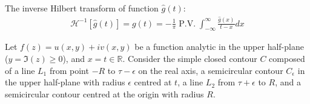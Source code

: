 \documentclass[12pt, english]{book}
\makeatletter
\renewenvironment{proof}[1][\proofname]{\par
	\pushQED{\qed}%
	\normalfont \topsep6\p@\@plus6\p@\relax
	\list{}{%
		\settowidth{\leftmargin}{\itshape\proofname:\hskip\labelsep}%
		\setlength{\labelwidth}{0pt}%
		\setlength{\itemindent}{-\leftmargin}%
	}%
	\item[\hskip\labelsep\itshape#1\@addpunct{:}]\ignorespaces
	}{ \popQED\endlist\@endpefalse}
\makeatother
\begin{document}
	\begin{theorem}
		\label{Inverse Hilbert Transform Theorem - Complex}
		The inverse Hilbert transform of function \(\hat{g}(t)\):
		\begin{align*}
			\mathcal{H}^{-1}[\hat{g}(t)] = g(t)
			= - \frac{1}{\pi} \operatorname{P.V.} \int_{-\infty}^{\infty} \frac{\hat{g}(x)}{t-x} dx 
		\end{align*}
	\end{theorem}
	\begin{proof}
		Let \(f(z) = u(x,y) + iv(x,y)\) be a function analytic in the upper half-plane (\(y = \Im(z) \geq 0 \)), and \(x = t \in \mathbb{R}\). Consider the simple closed contour \(C\) composed of a line \(L_1\) from point \(-R\) to \(\tau-\epsilon\) on the real axis, a semicircular contour \(C_\epsilon\) in the upper half-plane with radius \(\epsilon\) centred at \(t\), a line \(L_2\) from \(\tau+\epsilon\) to \(R\), and a semicircular contour centred at the origin with radius \(R\).
		

\end{proof}
\end{document}
